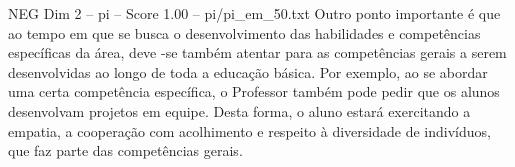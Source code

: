 \begin{textsample}{NEG Dim 2 – pi – Score 1.00 – pi/pi\_em\_50.txt}
Outro ponto importante é que ao tempo em que se busca o desenvolvimento das habilidades e competências específicas da área, deve -se também atentar para as competências gerais a serem desenvolvidas ao longo de toda a educação básica.
Por exemplo, ao se abordar uma certa competência específica, o Professor também pode pedir que os alunos desenvolvam projetos em equipe.
Desta forma, o aluno estará exercitando a empatia, a cooperação com acolhimento e respeito à diversidade de indivíduos, que faz parte das competências gerais.

\end{textsample}
